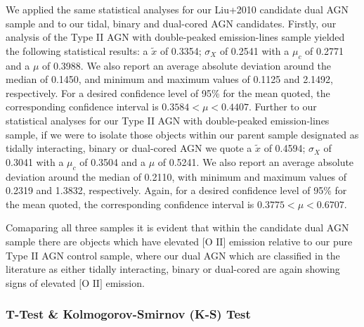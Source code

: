We applied the same statistical analyses for our Liu+2010 candidate dual AGN sample and to our tidal, binary and dual-cored AGN candidates. Firstly, our analysis of the Type II AGN with double-peaked emission-lines sample yielded the following statistical results: a $\tilde{x}$ of 0.3354; $\sigma_{X}$ of 0.2541 with a $\mu_{c}$ of 0.2771 and a $\mu$ of 0.3988. We also report an average absolute deviation around the median of 0.1450, and minimum and maximum values of 0.1125 and 2.1492, respectively. For a desired confidence level of 95\% for the mean quoted, the corresponding confidence interval is ${0.3584}<{\mu}<{0.4407}$. Further to our statistical analyses for our Type II AGN with double-peaked emission-lines sample, if we were to isolate those objects within our parent sample designated as tidally interacting, binary or dual-cored AGN we quote a $\tilde{x}$ of 0.4594; $\sigma_{X}$ of 0.3041 with a $\mu_{c}$ of 0.3504 and a $\mu$ of 0.5241. We also report an average absolute deviation around the median of 0.2110, with minimum and maximum values of 0.2319 and 1.3832, respectively. Again, for a desired confidence level of 95\% for the mean quoted, the corresponding confidence interval is ${0.3775}<{\mu}<{0.6707}$.

Comaparing all three samples it is evident that within the candidate dual AGN sample there are objects which have elevated $\text{[O II]}$ emission relative to our pure Type II AGN control sample, where our dual AGN which are classified in the literature as either tidally interacting, binary or dual-cored are again showing signs of elevated $\text{[O II]}$ emission.
 
\subsubsection{T-Test \& Kolmogorov-Smirnov (K-S) Test}